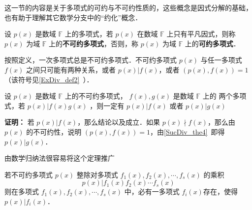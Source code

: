 

这一节的内容是关于多项式的可约与不可约性质的，这些概念是因式分解的基础，也有助于理解其它数学分支中的“约化”概念．
\begin{definition}{}\label{RedPol_def1}
设 $p(x)$ 是数域 $\mathbb{F}$ 上的多项式，若 $p(x)$ 在数域 $\mathbb{F}$ 上只有平凡因式，则称 $p(x)$ 为域 $\mathbb{F}$ 上的\textbf{不可约多项式}，否则，称 $p(x)$ 为域 $\mathbb{F}$ 上的\textbf{可约多项式}．
\end{definition}
按照定义，一次多项式总是不可约多项式．不可约多项式 $p(x)$ 与任一多项式 $f(x)$ 之间只可能有两种关系，或者 $p(x)|f(x)$，或者 $(p(x),f(x))=1$（该符号见\autoref{ExDiv_def2}~）．

\begin{theorem}{}
设 $p(x)$ 是数域 $\mathbb{F}$ 上的不可约多项式， $f(x),g(x)$ 是数域 $\mathbb{F}$ 上的 两个多项式，若 $p(x)|f(x)g(x)$ ，则一定有 $p(x)|f(x)$ 或者 $p(x)|g(x)$
\end{theorem}
\textbf{证明：} 若 $p(x)|f(x)$，那么结论以及成立．如果 $p(x)\nmid f(x)$，那么由 $p(x)$ 的不可约性，说明 $(p(x),f(x))=1$，由\autoref{SucDiv_the4}~即得 $p(x)|g(x)$．

由数学归纳法很容易将这个定理推广
\begin{theorem}{}
若不可约多项式 $p(x)$ 整除对多项式 $f_1(x),f_2(x),\cdots,f_s(x)$ 的乘积
\begin{equation}
p(x)|f_1(x)f_2(x)\cdots f_s(x)
\end{equation}
则在多项式 $f_1(x),f_2(x),\cdots,f_s(x)$ 中，必有一多项式 $f_i(x)$存在，使得 $p(x)|f_i(x)$．
\end{theorem}